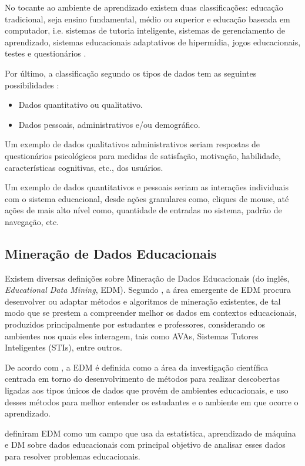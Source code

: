 No tocante ao ambiente de aprendizado existem duas classificações: educação
tradicional, seja ensino fundamental, médio ou superior e educação baseada em
computador, i.e. sistemas de tutoria inteligente, sistemas de gerenciamento de
aprendizado, sistemas educacionais adaptativos de hipermídia, jogos
educacionais, testes e questionários \cite{romero2013data}.

Por último, a classificação segundo os tipos de dados tem as seguintes
possibilidades \cite{bousbia2014contribution}:
\begin{itemize}
  \item Dados quantitativo ou qualitativo.
  \item Dados pessoais, administrativos e/ou demográfico.
\end{itemize}

Um exemplo de dados qualitativos administrativos seriam respostas de
questionários psicológicos para medidas de satisfação, motivação, habilidade,
características cognitivas, etc., dos usuários.

Um exemplo de dados quantitativos e pessoais seriam as interações individuais
com o sistema educacional, desde ações granulares como, cliques de mouse, até
ações de mais alto nível como, quantidade de entradas no sistema, padrão de
navegação, etc.

\subsection{Mineração de Dados Educacionais}

Existem diversas definições sobre Mineração de Dados Educacionais (do inglês,
\textit{Educational Data Mining}, EDM). Segundo
, a área emergente de EDM procura desenvolver ou
adaptar métodos e algoritmos de mineração existentes, de tal modo que se prestem
a compreender melhor os dados em contextos educacionais, produzidos
principalmente por estudantes e professores, considerando os ambientes nos quais
eles interagem, tais como AVAs, Sistemas Tutores Inteligentes (STIs), entre
outros.

De acordo com , a EDM é definida como a área da
investigação científica centrada em torno do desenvolvimento de métodos para
realizar descobertas ligadas aos tipos únicos de dados que provém de ambientes
educacionais, e uso desses métodos para melhor entender os estudantes e o
ambiente em que ocorre o aprendizado.

 definiram EDM como um campo que usa da
estatística, aprendizado de máquina e DM sobre dados educacionais com principal
objetivo de analisar esses dados  para resolver problemas educacionais.

